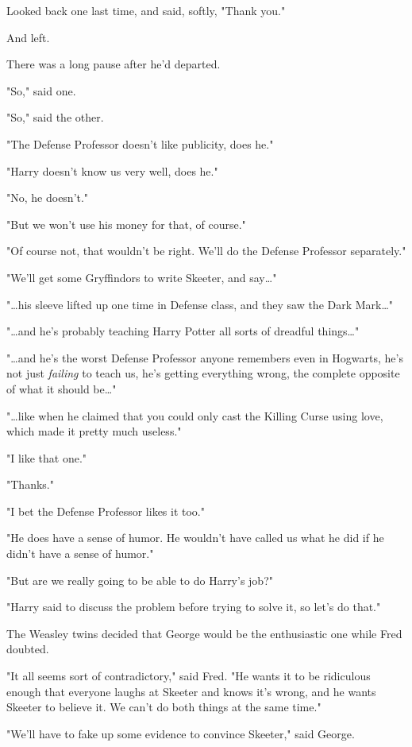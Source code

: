 Looked back one last time, and said, softly, "Thank you."

And left.

There was a long pause after he'd departed.

"So," said one.

"So," said the other.

"The Defense Professor doesn't like publicity, does he."

"Harry doesn't know us very well, does he."

"No, he doesn't."

"But we won't use his money for that, of course."

"Of course not, that wouldn't be right. We'll do the Defense Professor 
separately."

"We'll get some Gryffindors to write Skeeter, and say{\ldots}"

"{\ldots}his sleeve lifted up one time in Defense class, and they saw the Dark 
Mark{\ldots}"

"{\ldots}and he's probably teaching Harry Potter all sorts of dreadful 
things{\ldots}"

"{\ldots}and he's the worst Defense Professor anyone remembers even in 
Hogwarts, he's not just \emph{failing} to teach us, he's getting everything 
wrong, the complete opposite of what it should be{\ldots}"

"{\ldots}like when he claimed that you could only cast the Killing Curse using 
love, which made it pretty much useless."

"I like that one."

"Thanks."

"I bet the Defense Professor likes it too."

"He does have a sense of humor. He wouldn't have called us what he did if he 
didn't have a sense of humor."

"But are we really going to be able to do Harry's job?"

"Harry said to discuss the problem before trying to solve it, so let's do that."

The Weasley twins decided that George would be the enthusiastic one while Fred 
doubted.

"It all seems sort of contradictory," said Fred. "He wants it to be ridiculous 
enough that everyone laughs at Skeeter and knows it's wrong, and he wants 
Skeeter to believe it. We can't do both things at the same time."

"We'll have to fake up some evidence to convince Skeeter," said George.

